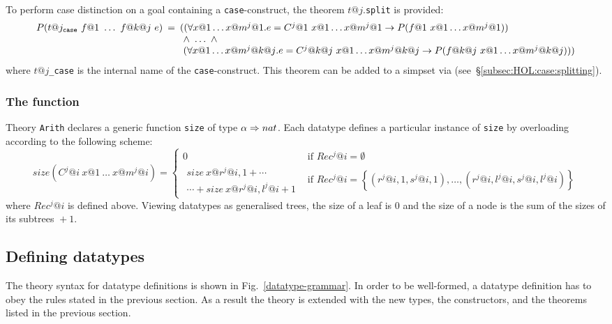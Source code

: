 To perform case distinction on a goal containing a \texttt{case}-construct,
the theorem $t@j.$\texttt{split} is provided:
\[
\begin{array}{@{}rcl@{}}
P(t@j_\mathtt{case}~f@1~\dots~f@{k@j}~e) &\!\!\!=&
\!\!\! ((\forall x@1 \dots x@{m^j@1}. e = C^j@1~x@1\dots x@{m^j@1} \to
                             P(f@1~x@1\dots x@{m^j@1})) \\
&&\!\!\! ~\land~ \dots ~\land \\
&&~\!\!\! (\forall x@1 \dots x@{m^j@{k@j}}. e = C^j@{k@j}~x@1\dots x@{m^j@{k@j}} \to
                             P(f@{k@j}~x@1\dots x@{m^j@{k@j}})))
\end{array}
\]
where $t@j$\texttt{_case} is the internal name of the \texttt{case}-construct.
This theorem can be added to a simpset via 
(see~\S\ref{subsec:HOL:case:splitting}).

\subsubsection{The function }\label{sec:HOL:size}

Theory \texttt{Arith} declares a generic function \texttt{size} of type
$\alpha\Rightarrow nat$.  Each datatype defines a particular instance of \texttt{size}
by overloading according to the following scheme:
\[
size(C^j@i~x@1~\dots~x@{m^j@i}) = \!
\left\{
\begin{array}{ll}
0 & \!\mbox{if $Rec^j@i = \emptyset$} \\
\!\!\begin{array}{l}
size~x@{r^j@{i,1}} + \cdots \\
\cdots + size~x@{r^j@{i,l^j@i}} + 1
\end{array} &
 \!\mbox{if $Rec^j@i = \left\{\left(r^j@{i,1},s^j@{i,1}\right),\ldots,
  \left(r^j@{i,l^j@i},s^j@{i,l^j@i}\right)\right\}$}
\end{array}
\right.
\]
where $Rec^j@i$ is defined above.  Viewing datatypes as generalised trees, the
size of a leaf is 0 and the size of a node is the sum of the sizes of its
subtrees ${}+1$.

\subsection{Defining datatypes}

The theory syntax for datatype definitions is shown in
Fig.~\ref{datatype-grammar}.  In order to be well-formed, a datatype
definition has to obey the rules stated in the previous section.  As a result
the theory is extended with the new types, the constructors, and the theorems
listed in the previous section.

